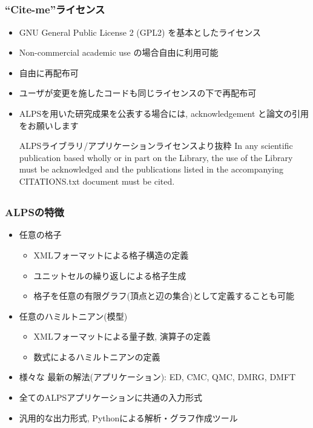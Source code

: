 \subsection*{\redb\whiteb\greenb}
\begin{frame}[t,fragile]
\frametitle{``Cite-me''ライセンス}
  \begin{itemize}
  \item GNU General Public License 2 (GPL2) を基本としたライセンス
  \item Non-commercial academic use の場合自由に利用可能
  \item 自由に再配布可
  \item ユーザが変更を施したコードも同じライセンスの下で再配布可
  \item ALPSを用いた研究成果を公表する場合には, acknowledgement と論文の引用をお願いします
    \begin{minipage}{.9\textwidth}
    \begin{block}{ALPSライブラリ/アプリケーションライセンスより抜粋}
      In any scientific publication based wholly or in part on the
      Library, the use of the Library must be acknowledged and the
      publications listed in the accompanying CITATIONS.txt document
      must be cited.
    \end{block}
    \end{minipage}
  \end{itemize}
\end{frame}

\subsection*{\redb\whiteb\greenb}
\begin{frame}[t,fragile]
  \frametitle{ALPSの特徴}
  \begin{itemize}
  \item {\color{red} 任意の}格子
    \begin{itemize}
    \item XMLフォーマットによる格子構造の定義
    \item ユニットセルの繰り返しによる格子生成
    \item 格子を任意の有限グラフ(頂点と辺の集合)として定義することも可能
    \end{itemize}
  \item {\color{red} 任意の}ハミルトニアン(模型)
    \begin{itemize}
    \item XMLフォーマットによる量子数, 演算子の定義
    \item 数式によるハミルトニアンの定義
    \end{itemize}
  \item 様々な{\color{red} 最新の}解法(アプリケーション): ED, CMC, QMC, DMRG, DMFT
  \item {\color{red} 全ての}ALPSアプリケーションに共通の入力形式
  \item {\color{red} 汎用的な}出力形式, Pythonによる解析・グラフ作成ツール
  \end{itemize}
\end{frame}

